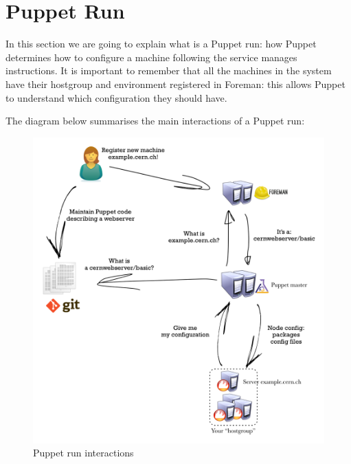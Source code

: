 \section{Puppet Run}

In this section we are going to explain what is a Puppet run: how Puppet
determines how to configure a machine following the service manages
instructions. It is important to remember that all the machines in the
system have their hostgroup and environment registered in Foreman: this
allows Puppet to understand which configuration they should have.

The diagram below summarises the main interactions of a Puppet run:

\begin{figure}[H]
\includegraphics[width=\textwidth,height=\textheight,keepaspectratio]{ConfigurationManagement/PuppetRun/PuppetRun.png}
\caption{Puppet run interactions}
\end{figure}

